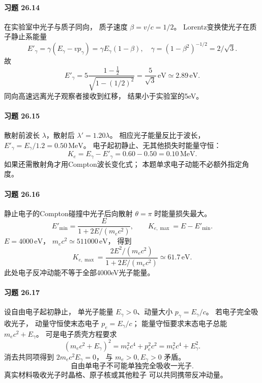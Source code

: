 \paragraph{习题 26.14}
在实验室中光子与质子同向，
质子速度 \(\beta=v/c=1/2\)。
Lorentz变换使光子在质子静止系能量
\[
E'_\gamma=\gamma(E_\gamma-vp_\gamma)
=\gamma E_\gamma(1-\beta),\quad
\gamma=(1-\beta^2)^{-1/2}=2/\sqrt3.
\]
故
\[
\boxed{E'_\gamma
=5\frac{1-\frac12}{\sqrt{1-(1/2)^2}}
=\frac5{\sqrt3}\,\mathrm{eV}
\simeq2.89\,\mathrm{eV}}.
\]
同向高速远离光子观察者接收到红移，
结果小于实验室的5eV。

\paragraph{习题 26.15}
散射前波长 \(\lambda\)，散射后
\(\lambda'=1.20\lambda\)。
相应光子能量反比于波长，
\(E'_\gamma=E_\gamma/1.2=0.50\,\mathrm{MeV}\)。
电子起初静止、无其他损失时能量守恒：
\[
\boxed{K_e=E_\gamma-E'_\gamma
=0.60-0.50=0.10\,\mathrm{MeV}}.
\]
如果还需散射角才用Compton波长变化式；
本题单求电子动能不必额外指定角度。

\paragraph{习题 26.16}
静止电子的Compton碰撞中光子后向散射
\(\theta=\pi\) 时能量损失最大。
\[
E'_{\min}=
\frac{E}{1+2E/(m_ec^2)},\qquad
K_{e,\max}=E-E'_{\min}.
\]
\(E=4000\,\mathrm{eV}\)，
\(m_ec^2\simeq511000\,\mathrm{eV}\)，
得到
\[
\boxed{K_{e,\max}
=\frac{2E^2/(m_ec^2)}{1+2E/(m_ec^2)}
\simeq61.7\,\mathrm{eV}}.
\]
此处电子反冲动能不等于全部4000eV光子能量。

\paragraph{习题 26.17}
设自由电子起初静止，
单光子能量 \(E_\gamma>0\)、动量大小
\(p_\gamma=E_\gamma/c\)。
若电子完全吸收光子，
动量守恒使末态电子
\(p_e=E_\gamma/c\)；
能量守恒要求末态电子总能
\(m_ec^2+E_\gamma\)。
可是电子质壳方程要求
\[
(m_ec^2+E_\gamma)^2
=m_e^2c^4+p_e^2c^2
=m_e^2c^4+E_\gamma^2.
\]
消去共同项得到
\(2m_ec^2E_\gamma=0\)，
与 \(m_e>0,E_\gamma>0\) 矛盾。
\[
\boxed{\text{自由单电子不可能单独完全吸收一光子}}.
\]
真实材料吸收光子时晶格、原子核或其他粒子
可以共同携带反冲动量。

